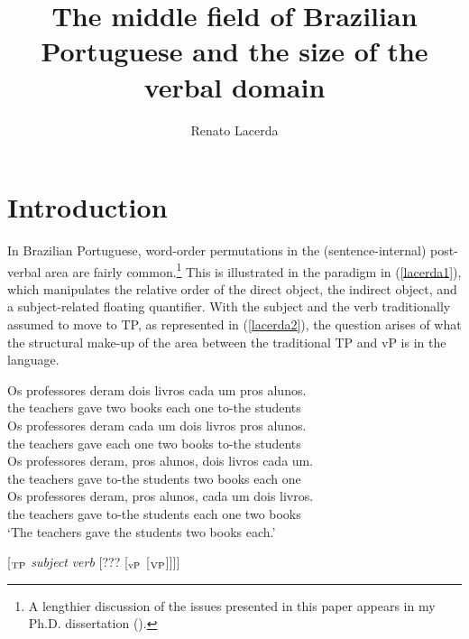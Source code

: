 \documentclass[output=paper]{langscibook}
\author{Renato Lacerda\affiliation{University of Connecticut}}
\title{The middle field of Brazilian Portuguese and the size of the verbal domain}
\begin{document}
\maketitle

\section{Introduction}
In Brazilian Portuguese, word-order permutations in the (sentence-internal) post-verbal area are fairly common.\footnote{A lengthier discussion of the issues presented in this paper appears in my Ph.D. dissertation (\citealt{Lacerda2020b}).}
This is illustrated in the paradigm in (\ref{lacerda1}), which manipulates the relative order of the direct object, the indirect object, and a subject-related floating quantifier. With the subject and the verb traditionally assumed to move to TP, as represented in (\ref{lacerda2}), the question arises of what the structural make-up of the area between the traditional TP and vP is in the language.

\begin{exe}
\ex \label{lacerda1}
\begin{xlist}
\ex \label{lacerda1a}
\gll Os professores deram dois livros cada um pros alunos.\\
the teachers gave two books each one to-the students\\

\ex \label{lacerda1b}
\gll Os professores deram cada um dois livros pros alunos.\\
the teachers gave each one two books to-the students\\

\ex \label{lacerda1c}
\gll Os professores deram, 	pros alunos, dois livros cada um.\\
the teachers gave to-the students two books each one\\

\ex \label{lacerda1d}
\gll Os	professores deram, 	pros alunos, cada um dois livros.\\
the teachers gave to-the students each one two books\\
\glt‘The teachers gave the students two books each.’	
\end{xlist}
\end{exe}

\begin{exe}
\ex \label{lacerda2}
[$_{\textnormal{TP}}$ \emph{subject} \emph{verb} [\hspace{0.5mm}??? [$_{\textnormal{vP}}$ [$_{\textnormal{VP}}$\hspace{0.5mm}]\hspace{0.5mm}]\hspace{0.5mm}]\hspace{0.5mm}]
\end{exe}
\end{document}

